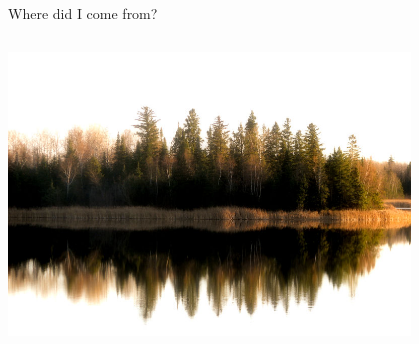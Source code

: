 \documentclass[serif]{beamer}\usepackage[]{graphicx}\usepackage[]{color}
\begin{document}
\begin{frame}{Where did I come from?}{}
\begin{columns}
\begin{column}{0.5\textwidth}
\begin{center}
\includegraphics[width=0.8\textwidth]{fig/mn_lake.jpg}
\end{center}
\end{column}
\end{columns}
\end{frame}
\end{document}
